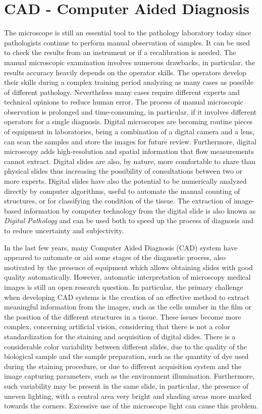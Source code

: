 \section{CAD - Computer Aided Diagnosis}
The microscope is still an essential tool to the pathology laboratory today since pathologists continue to perform manual observation of samples. It can be used to check the results from an instrument or if a recalibration is needed. The manual microscopic examination involves numerous drawbacks, in particular, the results accuracy heavily depends on the operator skills. The operators develop their skills during a complex training period analyzing as many cases as possible of different pathology. Nevertheless many cases require different experts and technical opinions to reduce human error. The process of manual microscopic observation is prolonged and time-consuming, in particular, if it involves different operators for a single diagnosis. Digital microscopes are becoming routine pieces of equipment in laboratories, being a combination of a digital camera and a lens, can scan the samples and store the images for future review.
Furthermore, digital microscopy adds high-resolution and spatial information that flow measurements cannot extract. Digital slides are also, by nature, more comfortable to share than physical slides thus increasing the possibility of consultations between two or more experts. Digital slides have also the potential to be numerically analyzed directly by computer algorithms, useful to automate the manual counting of structures, or for classifying the condition of the tissue. The extraction of image-based information by computer technology from the digital slide is also known as \textit{Digital Pathology} and can be used both to speed up the process of diagnosis and to reduce uncertainty and subjectivity.

In the last few years, many Computer Aided Diagnosis (\acs{CAD}) system have appeared to automate or aid some stages of the diagnostic process, also motivated by the presence of equipment which allows obtaining slides with good quality automatically. However, automatic interpretation of microscopy medical images is still an open research question. In particular, the primary challenge when developing CAD systems is the creation of an effective method to extract meaningful information from the images, such as the cells number in the film or the position of the different structures in a tissue. These issues become more complex, concerning artificial vision, considering that there is not a color standardization for the staining and acquisition of digital slides. There is a considerable color variability between different slides, due to the quality of the biological sample and the sample preparation, such as the quantity of dye used during the staining procedure, or due to different acquisition system and the image capturing parameters, such as the environment illumination. Furthermore, such variability may be present in the same slide, in particular, the presence of uneven lighting, with a central area very bright and shading areas more marked towards the corners.  Excessive use of the microscope light can cause this problem.

